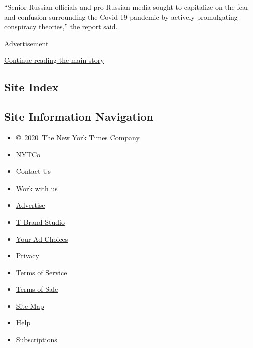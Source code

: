 ``Senior Russian officials and pro-Russian media sought to capitalize on
the fear and confusion surrounding the Covid-19 pandemic by actively
promulgating conspiracy theories,'' the report said.

Advertisement

\protect\hyperlink{after-bottom}{Continue reading the main story}

\hypertarget{site-index}{%
\subsection{Site Index}\label{site-index}}

\hypertarget{site-information-navigation}{%
\subsection{Site Information
Navigation}\label{site-information-navigation}}

\begin{itemize}
\tightlist
\item
  \href{https://help.nytimes3xbfgragh.onion/hc/en-us/articles/115014792127-Copyright-notice}{©~2020~The
  New York Times Company}
\end{itemize}

\begin{itemize}
\tightlist
\item
  \href{https://www.nytco.com/}{NYTCo}
\item
  \href{https://help.nytimes3xbfgragh.onion/hc/en-us/articles/115015385887-Contact-Us}{Contact
  Us}
\item
  \href{https://www.nytco.com/careers/}{Work with us}
\item
  \href{https://nytmediakit.com/}{Advertise}
\item
  \href{http://www.tbrandstudio.com/}{T Brand Studio}
\item
  \href{https://www.nytimes3xbfgragh.onion/privacy/cookie-policy\#how-do-i-manage-trackers}{Your
  Ad Choices}
\item
  \href{https://www.nytimes3xbfgragh.onion/privacy}{Privacy}
\item
  \href{https://help.nytimes3xbfgragh.onion/hc/en-us/articles/115014893428-Terms-of-service}{Terms
  of Service}
\item
  \href{https://help.nytimes3xbfgragh.onion/hc/en-us/articles/115014893968-Terms-of-sale}{Terms
  of Sale}
\item
  \href{https://spiderbites.nytimes3xbfgragh.onion}{Site Map}
\item
  \href{https://help.nytimes3xbfgragh.onion/hc/en-us}{Help}
\item
  \href{https://www.nytimes3xbfgragh.onion/subscription?campaignId=37WXW}{Subscriptions}
\end{itemize}
